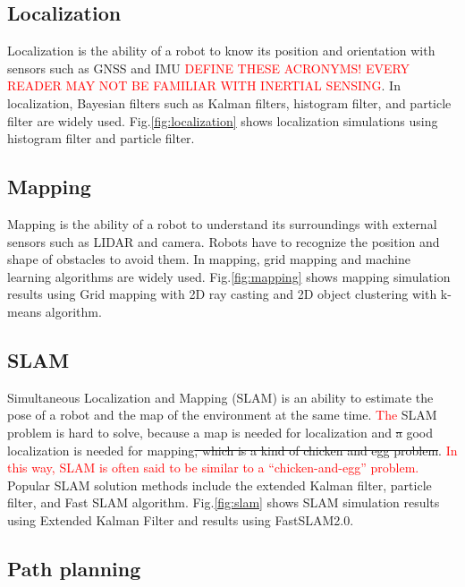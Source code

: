 \documentclass{bmvc2k}
\def\jwd{\textcolor{red}}
\begin{document}
\subsection{Localization}

Localization is the ability of a robot to know its position and orientation with sensors such as GNSS and IMU \jwd{DEFINE THESE ACRONYMS!  EVERY READER MAY NOT BE FAMILIAR WITH INERTIAL SENSING}.
In localization, Bayesian filters such as Kalman filters, histogram filter, and particle filter are widely used\cite{PR}.
Fig.\ref{fig:localization} shows localization simulations using histogram filter and particle filter.



\subsection{Mapping}
Mapping is the ability of a robot to understand its surroundings with external sensors such as LIDAR and camera.
Robots have to recognize the position and shape of obstacles to avoid them.
In mapping, grid mapping and machine learning algorithms are widely used\cite{PR}\cite{PRML}.
Fig.\ref{fig:mapping} shows mapping simulation results using Grid mapping with 2D ray casting and 2D object clustering with k-means algorithm.



\subsection{SLAM}
Simultaneous Localization and Mapping (SLAM) is an ability to estimate the pose of a robot and the map of the environment at the same time.
\jwd{The} SLAM problem is hard to solve, because a map is needed for localization and \st{a} good localization is needed for mapping\st{, which is a kind of chicken and egg problem}.  \jwd{In this way, SLAM is often said to be similar to a ``chicken-and-egg'' problem.}
Popular SLAM solution methods include the extended Kalman filter, particle filter, and Fast SLAM algorithm\cite{PR}.
Fig.\ref{fig:slam} shows SLAM simulation results using Extended Kalman Filter and results using FastSLAM2.0\cite{PR}.



\subsection{Path planning}
\end{document}
